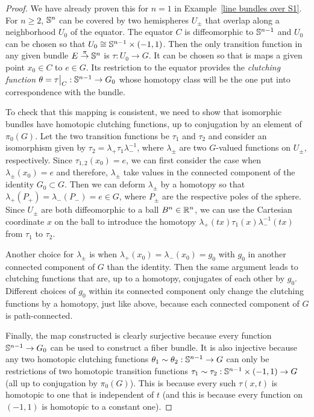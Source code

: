 \begin{proof}
    We have already proven this for $n=1$ in Example~\ref{line bundles over S1}. For $n\geq 2$, $\mathbb{S}^n$ can be covered by two hemispheres $U_\pm$ that overlap along a neighborhood $U_0$ of the equator. The equator $C$ is diffeomorphic to $\mathbb{S}^{n-1}$ and $U_0$ can be chosen so that $U_0\cong \mathbb{S}^{n-1}\times (-1,1)$. Then the only transition function in any given bundle $E\overset{\pi}{\to}\mathbb{S}^n$ is $\tau:U_0\to G$. It can be chosen so that is maps a given point $x_0\in C$ to $e\in G$. Its restriction to the equator provides the \emph{clutching function} $\theta=\restr{\tau}{C}:\bbS^{n-1}\to G_0$ whose homotopy class will be the one put into correspondence with the bundle. 
     
    To check that this mapping is consistent, we need to show that isomorphic bundles have homotopic clutching functions, up to conjugation by an element of $\pi_0(G)$. Let the two transition functions be $\tau_1$ and $\tau_2$ and consider an isomorphism given by $\tau_2=\lambda_+ \tau_1 \lambda_-^{-1}$, where $\lambda_\pm$ are two $G$-valued functions on $U_\pm$, respectively. Since $\tau_{1,2}(x_0)=e$, we can first consider the case when $\lambda_\pm(x_0)=e$ and therefore, $\lambda_\pm$ take values in the connected component of the identity $G_0\subset G$. Then we can deform $\lambda_\pm$ by a homotopy so that $\lambda_+(P_+)=\lambda_-(P_-)=e\in G$, where $P_\pm$ are the respective poles of the sphere. Since $U_\pm $ are both diffeomorphic to a ball $B^n\in\mathbb{R}^n$, we can use the Cartesian coordinate $x$ on the ball to introduce the homotopy $\lambda_+(tx)\tau_1(x) \lambda_-^{-1}(tx)$ from $\tau_1$ to $\tau_2$. 
    
    Another choice for $\lambda_\pm$ is when $\lambda_+(x_0)=\lambda_-(x_0)=g_0$ with $g_0$ in another connected component of $G$ than the identity. Then the same argument leads to clutching functions that are, up to a homotopy, conjugates of each other by $g_0$. Different choices of $g_0$ within its connected component only change the clutching functions by a homotopy, just like above, because each connected component of $G$ is path-connected.
    
    Finally, the map constructed is clearly surjective because every function $\mathbb{S}^{n-1}\to G_0$ can be used to construct a fiber bundle. It is also injective because any two homotopic clutching functions $\theta_1\sim\theta_2:\mathbb{S}^{n-1}\to G$ can only be restrictions of two homotopic transition functions $\tau_1\sim\tau_2:\mathbb{S}^{n-1}\times(-1,1)\to G$ (all up to conjugation by $\pi_0(G)$). This is because every such $\tau(x,t)$ is homotopic to one that is independent of $t$ (and this is because every function on $(-1,1)$ is homotopic to a constant one).
\end{proof}


